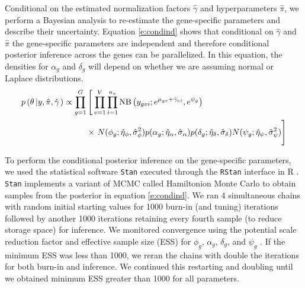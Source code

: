 \documentclass[useAMS,usenatbib,referee]{biom}
\newcommand{\Stan}{{\tt Stan}}
\newcommand{\RStan}{{\tt RStan}}
\begin{document}
Conditional on the estimated normalization factors $\hat{\gamma}$ and hyperparameters $\hat{\pi}$, we perform a Bayesian analysis to re-estimate the gene-specific parameters and describe their uncertainty. Equation \ref{e:condind} shows that conditional on $\hat{\gamma}$ and $\hat{\pi}$ the gene-specific parameters are independent and therefore conditional posterior inference across the genes can be parallelized. In this equation, the densities for $\alpha_g$ and $\delta_g$ will depend on whether we are assuming normal or Laplace distributions. 
\begin{equation}
\begin{split}
p\left(\theta\left|y,\hat{\pi},\hat{\gamma}\right.\right) 
\propto \prod_{g=1}^G & \left[ \,\prod_{v=1}^V \prod_{i=1}^{n_v} \mbox{NB}\left(y_{gvi};e^{\mu_{gv}+\hat{\gamma}_{vi}},e^{\psi_g}\right)  \right. \\
&\times 
\left. \vphantom{\prod_{v=1}^V}
N(\phi_g;\hat{\eta}_\phi, \hat{\sigma}_\phi^2)
p(\alpha_g;\hat{\eta}_\alpha, \hat{\sigma}_\alpha)
p(\delta_g;\hat{\eta}_\delta, \hat{\sigma}_\delta)
N(\psi_g;\hat{\eta}_\psi, \hat{\sigma}_\psi^2) 
\right]
\label{e:condind}
\end{split}
\end{equation}

To perform the conditional posterior inference on the gene-specific parameters, we used the statistical software \Stan{} \citep{stan-software:2014} executed through the \RStan{} interface \citep{rstan-software:2014} in R \citep{R2014}. \Stan{} implements a variant of MCMC called Hamiltonion Monte Carlo \citep{neal2011mcmc} to obtain samples from the posterior in equation \eqref{e:condind}. We ran 4 simultaneous chains with random initial starting values for 1000 burn-in (and tuning) iterations followed by another 1000 iterations retaining every fourth sample (to reduce storage space) for inference. We monitored convergence using the potential scale reduction factor and effective sample size (ESS) for $\phi_g$, $\alpha_g$, $\delta_g$, and $\psi_g$ \citep{Gelm:Rubi:infe:1992}. If the minimum ESS was less than 1000, we reran the chains with double the iterations for both burn-in and inference. We continued this restarting and doubling until we obtained minimum ESS greater than 1000 for all parameters.
\end{document}
